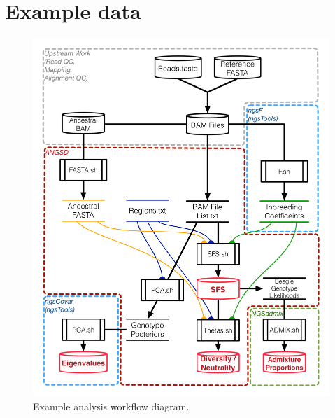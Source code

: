\documentclass[10pt,a4paper]{article}
\newcommand{\jri}[1]{\todo[size=\scriptsize, color=flame]{#1}}
\begin{document}
\section*{Example data}
\begin{figure}
\centering
\includegraphics[width=\linewidth]{figures/MainTextWorkflow.pdf}
\caption{Example analysis workflow diagram.}
\label{fig:workflow}
\end{figure}
\end{document}
